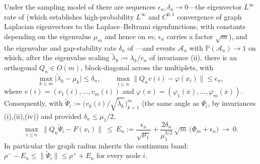 \documentclass[review,supplement]{siamart220329}
\begin{document}
\begin{lemma}\label{lem:transfer}
Under the sampling model of \cite{calder2022,calderlewicka2022} there are sequences
$\epsilon_n,\delta_n\to0$---the eigenvector $L^\infty$ rate of
\cite{calderlewicka2022} (which establishes high-probability $L^\infty$ and
$C^{0,1}$ convergence of graph Laplacian eigenvectors to the Laplace--Beltrami
eigenfunctions, with constants depending on the eigenvalue $\mu_m$ and hence on
$m$; $\epsilon_n$ carries a factor $\sqrt m$), and the eigenvalue and
gap-stability rate $\delta_n$ of \cite{calder2022}---and events $\mathcal A_n$
with $\mathbb P(\mathcal A_n)\to1$ on which, after the eigenvalue scaling
$\tilde\lambda_k:=\lambda_k/c_n$ of invariance (ii), there is an orthogonal
$Q_n\in O(m)$, block-diagonal across the multiplets, with
\[
\max_{k\le m}\big|\tilde\lambda_k-\mu_k\big|\le\delta_n,
\qquad
\max_{i\le n}\big\lVert Q_n v(i)-\varphi(x_i)\big\rVert\le\epsilon_n,
\]
where $v(i)=(v_1(i),\dots,v_m(i))$ and
$\varphi(x)=(\varphi_1(x),\dots,\varphi_m(x))$. Consequently, with
$\widetilde\Psi_i:=\big(v_k(i)/\sqrt{\tilde\lambda_k}\big)_{k=1}^m$ (the same
angle as $\Psi_i$, by invariances (i),(ii),(iv)) and provided $\delta_n\le\mu_1/2$,
\[
\max_{i\le n}\ \big\lVert Q_n\widetilde\Psi_i-F(x_i)\big\rVert\ \le\ E_n
:=\frac{\epsilon_n}{\sqrt{\mu_1}}
+\frac{2\delta_n}{\mu_1^{3/2}}\,\sqrt m\,\big(\Phi_m+\epsilon_n\big)
\ \longrightarrow\ 0 .
\]
In particular the graph radius inherits the continuum band:
$\rho^--E_n\le\lVert\widetilde\Psi_i\rVert\le\rho^++E_n$ for every node $i$.
\end{lemma}
\end{document}
